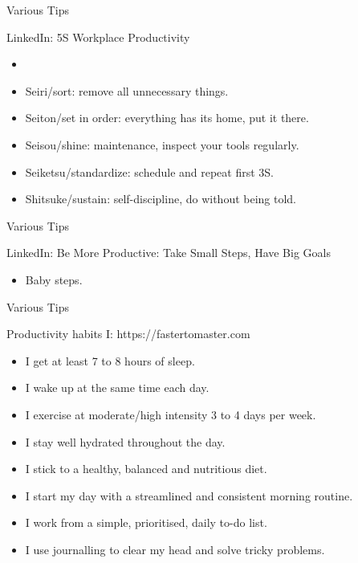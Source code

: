 \begin{frame}{Various Tips}
  \begin{block}{LinkedIn: 5S Workplace Productivity}
    \begin{itemize}
      \item 
      \item Seiri/sort: remove all unnecessary things.
      \item Seiton/set in order: everything has its home, put it there.
      \item Seisou/shine: maintenance, inspect your tools regularly.
      \item Seiketsu/standardize: schedule and repeat first 3S.
      \item Shitsuke/sustain: self-discipline, do without being told.
    \end{itemize}
  \end{block}
\end{frame}

\begin{frame}{Various Tips}
  \begin{block}{LinkedIn: Be More Productive: Take Small Steps, Have Big Goals}
    \begin{itemize}
      \item Baby steps. 
    \end{itemize}
  \end{block}
\end{frame}

\begin{frame}{Various Tips}
  \begin{block}{Productivity habits I: https://fastertomaster.com}
    \begin{itemize}
      \item I get at least 7 to 8 hours of sleep.
      \item I wake up at the same time each day.
      \item I exercise at moderate/high intensity 3 to 4 days per week.
      \item I stay well hydrated throughout the day.
      \item I stick to a healthy, balanced and nutritious diet.
      \item I start my day with a streamlined and consistent morning routine.
      \item I work from a simple, prioritised, daily to-do list.
      \item I use journalling to clear my head and solve tricky problems.
    \end{itemize}
  \end{block}
\end{frame}

